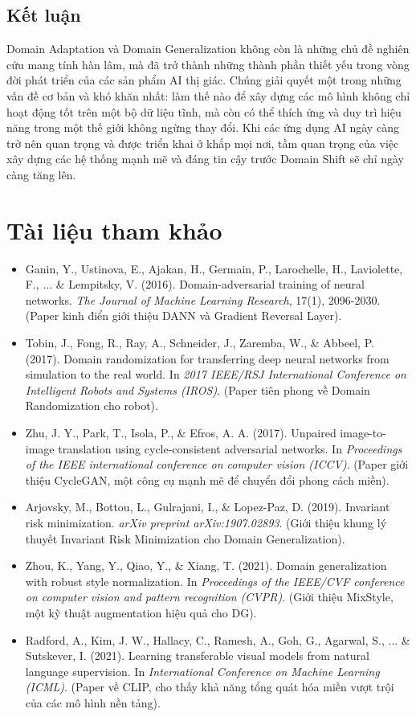 \subsection{Kết luận}
Domain Adaptation và Domain Generalization không còn là những chủ đề nghiên cứu mang tính hàn lâm, mà đã trở thành những thành phần thiết yếu trong vòng đời phát triển của các sản phẩm AI thị giác. Chúng giải quyết một trong những vấn đề cơ bản và khó khăn nhất: làm thế nào để xây dựng các mô hình không chỉ hoạt động tốt trên một bộ dữ liệu tĩnh, mà còn có thể thích ứng và duy trì hiệu năng trong một thế giới không ngừng thay đổi. Khi các ứng dụng AI ngày càng trở nên quan trọng và được triển khai ở khắp mọi nơi, tầm quan trọng của việc xây dựng các hệ thống mạnh mẽ và đáng tin cậy trước Domain Shift sẽ chỉ ngày càng tăng lên.

\section*{Tài liệu tham khảo}
\begin{itemize}
	\item[1] Ganin, Y., Ustinova, E., Ajakan, H., Germain, P., Larochelle, H., Laviolette, F., ... \& Lempitsky, V. (2016). Domain-adversarial training of neural networks. \textit{The Journal of Machine Learning Research}, 17(1), 2096-2030. (Paper kinh điển giới thiệu DANN và Gradient Reversal Layer).
	\item[2] Tobin, J., Fong, R., Ray, A., Schneider, J., Zaremba, W., \& Abbeel, P. (2017). Domain randomization for transferring deep neural networks from simulation to the real world. In \textit{2017 IEEE/RSJ International Conference on Intelligent Robots and Systems (IROS)}. (Paper tiên phong về Domain Randomization cho robot).
	\item[3] Zhu, J. Y., Park, T., Isola, P., \& Efros, A. A. (2017). Unpaired image-to-image translation using cycle-consistent adversarial networks. In \textit{Proceedings of the IEEE international conference on computer vision (ICCV)}. (Paper giới thiệu CycleGAN, một công cụ mạnh mẽ để chuyển đổi phong cách miền).
	\item[4] Arjovsky, M., Bottou, L., Gulrajani, I., \& Lopez-Paz, D. (2019). Invariant risk minimization. \textit{arXiv preprint arXiv:1907.02893}. (Giới thiệu khung lý thuyết Invariant Risk Minimization cho Domain Generalization).
	\item[5] Zhou, K., Yang, Y., Qiao, Y., \& Xiang, T. (2021). Domain generalization with robust style normalization. In \textit{Proceedings of the IEEE/CVF conference on computer vision and pattern recognition (CVPR)}. (Giới thiệu MixStyle, một kỹ thuật augmentation hiệu quả cho DG).
	\item[6] Radford, A., Kim, J. W., Hallacy, C., Ramesh, A., Goh, G., Agarwal, S., ... \& Sutskever, I. (2021). Learning transferable visual models from natural language supervision. In \textit{International Conference on Machine Learning (ICML)}. (Paper về CLIP, cho thấy khả năng tổng quát hóa miền vượt trội của các mô hình nền tảng).
\end{itemize}